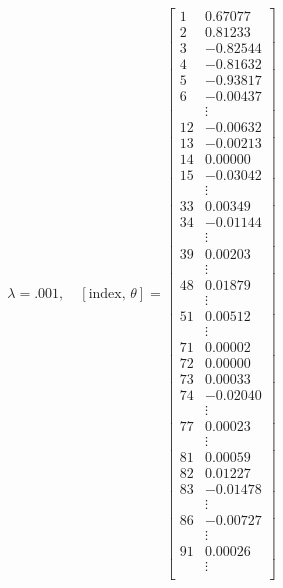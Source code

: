 \documentclass[11pt]{article}
\begin{document}
\begin{align*}
    \lambda = .001, \quad
    [\text{index, } \theta] = 
    \begin{bmatrix}
        1  &      0.67077 \\
        2  &      0.81233 \\
        3  &     -0.82544 \\
        4  &     -0.81632 \\
        5  &     -0.93817 \\
        6  &     -0.00437 \\
            & \vdots \\
        12  &    -0.00632 \\
        13  &    -0.00213 \\
        14  &     0.00000 \\
        15  &    -0.03042 \\
            & \vdots \\
        33  &     0.00349 \\
        34  &    -0.01144 \\
            & \vdots \\
        39  &     0.00203 \\
            & \vdots \\
        48  &     0.01879 \\
            & \vdots \\
        51  &     0.00512 \\
            & \vdots \\
        71  &     0.00002 \\
        72  &     0.00000 \\
        73  &     0.00033 \\
        74  &    -0.02040 \\
            & \vdots \\
        77  &     0.00023 \\
            & \vdots \\
        81  &     0.00059 \\
        82  &     0.01227 \\
        83  &    -0.01478 \\
            & \vdots \\
        86  &    -0.00727 \\
            & \vdots \\
        91  &     0.00026 \\
            & \vdots \\

\end{bmatrix}
\end{align*}
\end{document}
